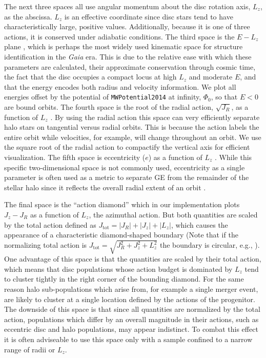 The next three spaces all use angular momentum about the disc rotation axis, $L_{z}$, as the abscissa. $L_{z}$ is an effective coordinate since disc stars tend to have characteristically large, positive values. Additionally, because it is one of three actions, it is conserved under adiabatic conditions. The third space is the $E-L_{z}$ plane \citep[e.g. ][]{helmi18,koppelman19b, naidu20,feuillet20,cordoni20,horta21}, which is perhaps the most widely used kinematic space for structure identification in the \textit{Gaia} era. This is due to the relative ease with which these parameters are calculated, their approximate conservation through cosmic time, the fact that the disc occupies a compact locus at high $L_{z}$ and moderate $E$, and that the energy encodes both radius and velocity information. We plot all energies offset by the potential of \texttt{MWPotential2014} at infinity, $\Phi_{0}$, so that $E<0$ are bound orbits. The fourth space is the root of the radial action, $\sqrt{J_{R}}$, as a function of $L_{z}$ \citep[e.g.][]{trick19,feuillet20,matsuno21,horta21}. By using the radial action this space can very efficiently separate halo stars on tangential versus radial orbits. This is because the action labels the entire orbit while velocities, for example, will change throughout an orbit. We use the square root of the radial action to compactify the vertical axis for efficient visualization. The fifth space is eccentricity ($e$) as a function of $L_{z}$ \citep[e.g.][]{cordoni20}. While this specific two-dimensional space is not commonly used, eccentricity as a single parameter is often used as a metric to separate GE from the remainder of the stellar halo since it reflects the overall radial extent of an orbit \citep[e.g.][]{belokurov18,mackereth20,naidu20}.

The final space is the ``action diamond'' \citep[e.g. ][]{vasiliev19,myeong19,monty20,cordoni20,naidu20} which in our implementation plots $J_{z}-J_{R}$ as a function of $L_{z}$, the azimuthal action. But both quantities are scaled by the total action defined as $J_\mathrm{tot}=\lvert J_{R} \rvert + \lvert J_{z} \rvert + \lvert L_{z} \rvert$, which causes the appearance of a characteristic diamond-shaped boundary (Note that if the normalizing total action is $J_\mathrm{tot}= \sqrt{ J_{R}^{2} + J_{z}^{2} + L_{z}^{2}}$ the boundary is circular, e.g., \citealt{naidu20}). One advantage of this space is that the quantities are scaled by their total action, which means that disc populations whose action budget is dominated by $L_{z}$ tend to cluster tightly in the right corner of the bounding diamond. For the same reason halo sub-populations which arise from, for example a single merger event, are likely to cluster at a single location defined by the actions of the progenitor. The downside of this space is that since all quantities are normalized by the total action, populations which differ by an overall magnitude in their actions, such as eccentric disc and halo populations, may appear indistinct. To combat this effect it is often adviseable to use this space only with a sample confined to a narrow range of radii or $L_{z}$.

